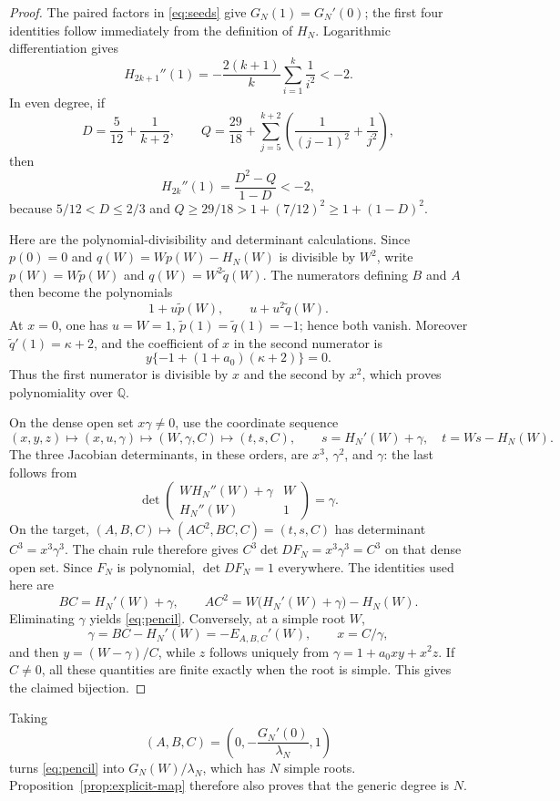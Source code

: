 \documentclass[11pt]{article}
\newcommand{\Q}{\mathbb Q}
\numberwithin{equation}{section}
\begin{document}
\begin{proof}
The paired factors in \eqref{eq:seeds} give \(G_N(1)=G_N'(0)\); the first four
identities follow immediately from the definition of \(H_N\).
Logarithmic differentiation gives
\[
 H_{2k+1}''(1)
 =-\frac{2(k+1)}{k}\sum_{i=1}^k\frac1{i^2}<-2.
\]
In even degree, if
\[
 D=\frac5{12}+\frac1{k+2},\qquad
 Q=\frac{29}{18}+
 \sum_{j=5}^{k+2}\left(\frac1{(j-1)^2}+\frac1{j^2}\right),
\]
then
\[
 H_{2k}''(1)=\frac{D^2-Q}{1-D}<-2,
\]
because \(5/12<D\leq2/3\) and
\(Q\geq29/18>1+(7/12)^2\geq1+(1-D)^2\).

Here are the polynomial-divisibility and determinant calculations.
Since \(p(0)=0\) and \(q(W)=Wp(W)-H_N(W)\) is divisible by \(W^2\),
write \(p(W)=W\widetilde p(W)\) and
\(q(W)=W^2\widetilde q(W)\).  The numerators defining \(B\) and \(A\)
then become the polynomials
\[
 1+u\widetilde p(W),\qquad u+u^2\widetilde q(W).
\]
At \(x=0\), one has \(u=W=1\),
\(\widetilde p(1)=\widetilde q(1)=-1\); hence both vanish.
Moreover \(\widetilde q'(1)=\kappa+2\), and the coefficient of \(x\)
in the second numerator is
\[
 y\{-1+(1+a_0)(\kappa+2)\}=0.
\]
Thus the first numerator is divisible by \(x\) and the second by \(x^2\),
which proves polynomiality over \(\Q\).

On the dense open set \(x\gamma\neq0\), use the coordinate sequence
\[
 (x,y,z)\longmapsto(x,u,\gamma)\longmapsto(W,\gamma,C)
 \longmapsto(t,s,C),
 \qquad s=H_N'(W)+\gamma,\quad t=Ws-H_N(W).
\]
The three Jacobian determinants, in these orders, are
\(x^3\), \(\gamma^2\), and \(\gamma\): the last follows from
\[
 \det\begin{pmatrix}WH_N''(W)+\gamma&W\\H_N''(W)&1\end{pmatrix}
 =\gamma.
\]
On the target, \((A,B,C)\mapsto(AC^2,BC,C)=(t,s,C)\)
has determinant \(C^3=x^3\gamma^3\).  The chain rule therefore gives
\(C^3\det DF_N=x^3\gamma^3=C^3\) on that dense open set.
Since \(F_N\) is polynomial, \(\det DF_N=1\) everywhere.
The identities used here are
\[
 BC=H_N'(W)+\gamma,\qquad
 AC^2=W\bigl(H_N'(W)+\gamma\bigr)-H_N(W).
\]
Eliminating \(\gamma\) yields \eqref{eq:pencil}.  Conversely, at a simple root \(W\),
\[
 \gamma=BC-H_N'(W)=-E_{A,B,C}'(W),\qquad x=C/\gamma,
\]
and then \(y=(W-\gamma)/C\), while \(z\) follows uniquely from
\(\gamma=1+a_0xy+x^2z\).  If \(C\neq0\), all these quantities are finite
exactly when the root is simple.  This gives the claimed bijection.
\end{proof}

Taking
\[
 (A,B,C)=\left(0,-\frac{G_N'(0)}{\lambda_N},1\right)
\]
turns \eqref{eq:pencil} into \(G_N(W)/\lambda_N\), which has \(N\) simple roots.
Proposition~\ref{prop:explicit-map} therefore also proves that the generic
degree is \(N\).
\end{document}
